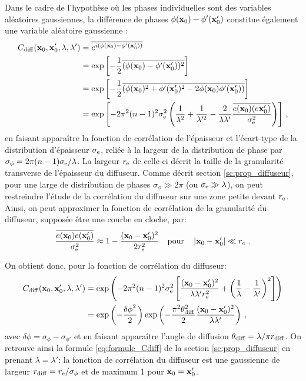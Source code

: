 Dans le cadre de l'hypothèse où les phases individuelles sont des variables aléatoires gaussiennes, la différence de phases $\phi(\mathbf{x}_0)-\phi'(\mathbf{x}_0')$ constitue également une variable aléatoire gaussienne \citep{goodman2007speckle}:
\begin{align}
C_{\mathrm{diff}}(\mathbf{x}_0,\mathbf{x}_0',\lambda,\lambda') &= \overline{e^{i(\phi(\mathbf{x}_0) - \phi'(\mathbf{x}_0'))}} \\
&= \exp{\left[-\frac{1}{2} \overline{(\phi(\mathbf{x}_0)-\phi'(\mathbf{x}_0'))^2}\right]} \\
&= \exp{\left[ -\frac{1}{2} \overline{(\phi(\mathbf{x}_0)^2 + \phi'(\mathbf{x}_0')^2 -2 \phi(\mathbf{x}_0) \phi'(\mathbf{x}_0'))} \right] } \\
&= \exp{\left[-2\pi^2 (n-1)^2 \sigma_{\mathrm{e}}^2 \left( \frac{1}{\lambda^2} + \frac{1}{\lambda'^2} - \frac{2}{\lambda\lambda'} \frac{\overline{e(\mathbf{x}_0)(e\mathbf{x}_0')}}{\sigma_{\mathrm{e}}^2}\right)\right]} \text{ ,}
\end{align}
en faisant apparaître la fonction de corrélation de l'épaisseur et l'écart-type de la distribution d'épaisseur $\sigma_{\mathrm{e}}$, reliée à la largeur de la distribution de phase par $\sigma_{\phi} = 2\pi (n-1) \sigma_{\mathrm{e}} /\lambda$. La largeur $r_{\mathrm{e}}$ de celle-ci décrit la taille de la granularité transverse de l'épaisseur du diffuseur. Comme décrit section \ref{sc:prop_diffuseur}, pour une large de distribution de phases $\sigma_{\phi} \gg 2\pi$ (ou $\sigma_{\mathrm{e}} \gg \lambda$), on peut restreindre l'étude de la corrélation du diffuseur sur une zone petite devant $r_{\mathrm{e}}$. Ainsi, on peut approximer la fonction de corrélation de la granularité du diffuseur, supposée être une courbe en cloche, par:
\begin{equation}
\frac{\overline{e(\mathbf{x}_0)e(\mathbf{x}_0')}}{\sigma_{\mathrm{e}}^2}\approx 1- \frac{(\mathbf{x}_0 - \mathbf{x}_0')^2}{2r_{\mathrm{e}}^2} \quad \text{pour} \quad \left| \mathbf{x}_0-\mathbf{x}_0' \right| \ll r_{\mathrm{e}} \text{ .}
\end{equation}

On obtient donc, pour la fonction de corrélation du diffuseur:
\begin{align}
C_{\mathrm{diff}}(\mathbf{x}_0,\mathbf{x}_0',\lambda,\lambda') &= \exp{\left( -2 \pi^2 (n-1)^2 \sigma_{\mathrm{e}}^2 \left[ \frac{(\mathbf{x}_0- \mathbf{x}_0')^2}{\lambda \lambda' r_{\mathrm{e}}^2} + \left( \frac{1}{\lambda} - \frac{1}{\lambda'} \right)^2 \right] \right)} \\
&= \exp{\left(-\frac{{\delta\phi}^2}{2}\right)} \exp{\left(-\frac{\pi^2 \theta_{\mathrm{diff}}^2}{2} \frac{(\mathbf{x}_0-\mathbf{x}_0')^2}{\lambda \lambda'}\right)} \text{ ,}
\end{align}
avec $\delta\phi=\sigma_{\phi} - \sigma_{\phi'}$ et en faisant apparaître l'angle de diffusion $\theta_{\mathrm{diff}}=\lambda /\pi r_{\mathrm{diff}}$. On retrouve ainsi la formule \ref{eq:formule_Cdiff} de la section \ref{sc:prop_diffuseur} en prenant $\lambda=\lambda'$: la fonction de corrélation du diffuseur est une gaussienne de largeur $r_{\mathrm{diff}}=r_{\mathrm{e}}/\sigma_{\phi}$ et de maximum 1 pour $\mathbf{x}_0=\mathbf{x}_0'$.




